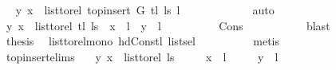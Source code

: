 \begin{isabellebody}
\ \isamarkupfalse%
\ {\isachardoublequoteopen}{\isacharparenleft}{\kern0pt}y{\isacharcomma}{\kern0pt}\ x{\isacharparenright}{\kern0pt}\ {\isasymin}\ list{\isacharunderscore}{\kern0pt}to{\isacharunderscore}{\kern0pt}rel\ {\isacharparenleft}{\kern0pt}top{\isacharunderscore}{\kern0pt}insert\ G\ {\isacharparenleft}{\kern0pt}tl\ ls{\isacharparenright}{\kern0pt}\ l{\isacharparenright}{\kern0pt}{\isachardoublequoteclose}\isanewline
\ \ \ \ \ \ \ \ \isamarkupfalse%
\ {}\ \isamarkupfalse%
\ auto\isanewline
\ \ \ \ \ \ \isamarkupfalse%
\ \isamarkupfalse%
\ {\isachardoublequoteopen}{\isacharparenleft}{\kern0pt}y{\isacharcomma}{\kern0pt}\ x{\isacharparenright}{\kern0pt}\ {\isasymin}\ list{\isacharunderscore}{\kern0pt}to{\isacharunderscore}{\kern0pt}rel\ {\isacharparenleft}{\kern0pt}tl\ ls{\isacharparenright}{\kern0pt}\ {\isasymor}\ x\ {\isacharequal}{\kern0pt}\ l\ {\isasymor}\ y\ {\isacharequal}{\kern0pt}\ l{\isachardoublequoteclose}\isanewline
\ \ \ \ \ \ \ \ \isamarkupfalse%
\ Cons\ {}\isanewline
\ \ \ \ \ \ \ \ \isamarkupfalse%
\ blast\ \isanewline
\ \ \ \ \ \ \isamarkupfalse%
\ \isamarkupfalse%
\ {\isacharquery}{\kern0pt}thesis\ \isamarkupfalse%
\ list{\isacharunderscore}{\kern0pt}to{\isacharunderscore}{\kern0pt}rel{\isacharunderscore}{\kern0pt}mono{}\ hd{\isacharunderscore}{\kern0pt}Cons{\isacharunderscore}{\kern0pt}tl\ list{\isachardot}{\kern0pt}sel{\isacharparenleft}{\kern0pt}{}{\isacharparenright}{\kern0pt}\isanewline
\ \ \ \ \ \ \ \ \isamarkupfalse%
\ {\isacharparenleft}{\kern0pt}metis{\isacharparenright}{\kern0pt}\ \isanewline
\ \ \ \ \isamarkupfalse%
\ \ \isanewline
\ \ \isamarkupfalse%
\isanewline
{}\isamarkupfalse%
%
\endisatagproof
{\isafoldproof}%
%
\isadelimproof
\isanewline
%
\endisadelimproof
\isanewline
\isanewline
{}\isamarkupfalse%
\ top{\isacharunderscore}{\kern0pt}insert{\isacharunderscore}{\kern0pt}elims{\isacharcolon}{\kern0pt}\isanewline
\ \ \ {\isachardoublequoteopen}{\isacharparenleft}{\kern0pt}y{\isacharcomma}{\kern0pt}\ x{\isacharparenright}{\kern0pt}\ {\isasymnotin}\ list{\isacharunderscore}{\kern0pt}to{\isacharunderscore}{\kern0pt}rel\ ls{\isachardoublequoteclose}\isanewline
\ \ \ \ \ {\isachardoublequoteopen}x\ {\isasymnoteq}\ l{\isachardoublequoteclose}\isanewline
\ \ \ \ \ {\isachardoublequoteopen}y\ {\isasymnoteq}\ l{\isachardoublequoteclose}\isanewline

\end{isabellebody}
